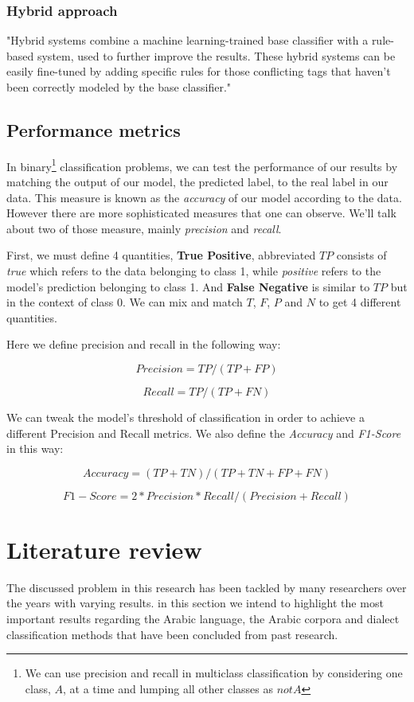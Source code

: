 \documentclass[12pt]{diazessay}
\begin{document}
        
        \subsubsection{Hybrid approach}
        "Hybrid systems combine a machine learning-trained base classifier with a rule-based system, used to further improve the results. These hybrid systems can be easily fine-tuned by adding specific rules for those conflicting tags that haven’t been correctly modeled by the base classifier."\cite{monkey_learn_NLP}
        
        
    \subsection{Performance metrics}
    In binary\footnote{We can use precision and recall in multiclass classification by considering one class, \(A\), at a time and lumping all other classes as \(not A\)} classification problems, we can test the performance of our results by matching the output of our model, the predicted label, to the real label in our data. This measure is known as the \emph{accuracy} of our model according to the data. However there are more sophisticated measures that one can observe. We'll talk about two of those measure, mainly \emph{precision} and \emph{recall}.
    
    First, we must define 4 quantities, \textbf{True Positive}, abbreviated \(TP\) consists of \emph{true} which refers to the data belonging to class 1, while \emph{positive} refers to the model's prediction belonging to class 1. And \textbf{False Negative} is similar to \(TP\) but in the context of class 0. We can mix and match \(T\), \(F\), \(P\) and \(N\) to get 4 different quantities.
    
    Here we define precision and recall in the following way:
    
    \[Precision = TP / (TP + FP)\]
    
    \[Recall = TP / (TP + FN)\]
    
    We can tweak the model's threshold of classification in order to achieve a different Precision and Recall metrics. We also define the \emph{Accuracy} and \emph{F1-Score} in this way:
    
    \[Accuracy = (TP+TN) / (TP + TN + FP + FN)\]
    
    \[F1-Score = 2 * Precision * Recall / (Precision + Recall)\]


\section{Literature review}
The discussed problem in this research has been tackled by many researchers over the years with varying results. in this section we intend to highlight the most important results regarding the Arabic language, the Arabic corpora and dialect classification methods that have been concluded from past research.
    
\end{document}
